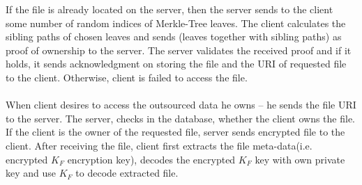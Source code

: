 \documentclass[12pt]{article}
\begin{document}
If the file is already located on the server, then the server sends to the client some number of random indices of Merkle-Tree leaves. The client calculates the sibling paths of chosen leaves  and sends (leaves together with sibling paths) as proof of ownership to the server. The server validates the received proof and if it holds, it sends acknowledgment on storing the file and the URI of requested file to the client. Otherwise, client is failed to access the file.\\\\
When client desires to access the outsourced data he owns -- he sends the file URI to the server. The server, checks in the database, whether the client owns the file. If the client is the owner of the requested file, server sends encrypted file to the client. After receiving the file, client first extracts the file meta-data(i.e. encrypted $K_F$ encryption key), decodes the encrypted $K_F$ key with own private key and use $K_F$ to decode extracted file.\\\\
\end{document}
